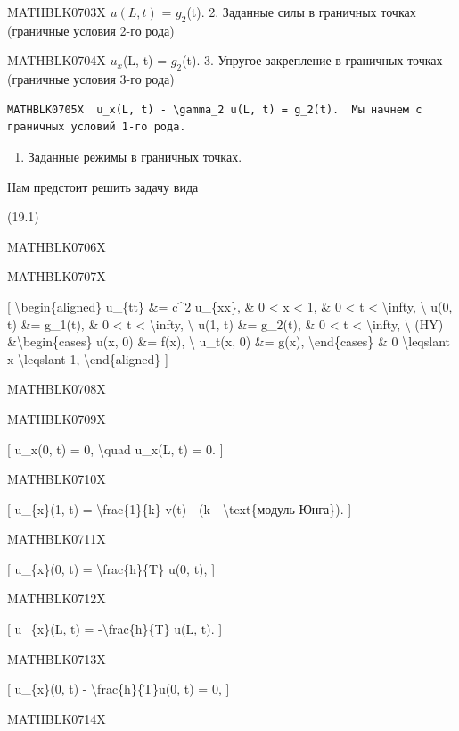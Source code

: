 \documentclass[
]{article}
\providecommand{\tightlist}{%
  \setlength{\itemsep}{0pt}\setlength{\parskip}{0pt}}
\begin{document}
MATHBLK0703X \(u(L, t)\) = \(g_2\)(t). 2. Заданные силы в граничных
точках (граничные условия 2-го рода)

MATHBLK0704X \(u_x\)(L, t) = \(g_2\)(t). 3. Упругое закрепление в
граничных точках (граничные условия 3-го рода)

\begin{verbatim}
MATHBLK0705X  u_x(L, t) - \gamma_2 u(L, t) = g_2(t).  Мы начнем с граничных условий 1-го рода.
\end{verbatim}

\begin{enumerate}
\def\labelenumi{\arabic{enumi}.}
\tightlist
\item
  Заданные режимы в граничных точках.
\end{enumerate}

Нам предстоит решить задачу вида

(19.1)

MATHBLK0706X

MATHBLK0707X

{[} \textbackslash begin\{aligned\} u\_\{tt\} \&= c\^{}2 u\_\{xx\}, \& 0
\textless{} x \textless{} 1, \& 0 \textless{} t \textless{}
\textbackslash infty, \textbackslash{} u(0, t) \&= g\_1(t), \& 0
\textless{} t \textless{} \textbackslash infty, \textbackslash{} u(1, t)
\&= g\_2(t), \& 0 \textless{} t \textless{} \textbackslash infty,
\textbackslash{} (HY) \&\textbackslash begin\{cases\} u(x, 0) \&= f(x),
\textbackslash{} u\_t(x, 0) \&= g(x), \textbackslash end\{cases\} \& 0
\textbackslash leqslant x \textbackslash leqslant 1,
\textbackslash end\{aligned\} {]}

MATHBLK0708X

MATHBLK0709X

{[} u\_x(0, t) = 0, \textbackslash quad u\_x(L, t) = 0. {]}

MATHBLK0710X

{[} u\_\{x\}(1, t) = \textbackslash frac\{1\}\{k\} v(t) - (k -
\textbackslash text\{модуль Юнга\}). {]}

MATHBLK0711X

{[} u\_\{x\}(0, t) = \textbackslash frac\{h\}\{T\} u(0, t), {]}

MATHBLK0712X

{[} u\_\{x\}(L, t) = -\textbackslash frac\{h\}\{T\} u(L, t). {]}

MATHBLK0713X

{[} u\_\{x\}(0, t) - \textbackslash frac\{h\}\{T\}u(0, t) = 0, {]}

MATHBLK0714X
\end{document}
